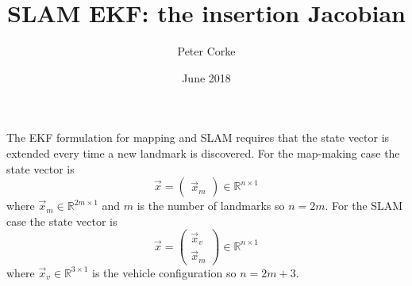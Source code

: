 \documentclass[a4paper]{article}
\title{SLAM EKF: the insertion Jacobian}
\author{Peter Corke}
\date{June 2018}
\newcommand{\matdim}[1]{\text{\scriptsize{\color{red}#1}}}
\newenvironment{ppmatrix}[4]{\def\ppmA{#3}\def\ppmB{#4}\begin{array}{r} \matdim{#1} \\ \matdim{#2} \\ \, \end{array} \hspace*{-2ex} \begin{array}{c} \left( \hspace{-1ex} \begin{array}{cc}}
{\end{array} \hspace{-1ex} \right) \\  \begin{array}{cc} \matdim{\ppmA} & \matdim{\ppmB} \end{array} \end{array}}
\begin{document}
\maketitle

%
%


The EKF formulation for mapping and SLAM requires that the state vector is extended every time a new landmark is discovered.
For the  map-making case the state vector is 
\[
\vec{x} = \begin{pmatrix} \vec{x}_m \end{pmatrix} \in \mathbb{R}^{n \times 1}
\]
where $\vec{x}_m \in \mathbb{R}^{2m \times 1}$ and $m$ is the number of landmarks so $n = 2m$.
For the SLAM case the state vector is
\[
\vec{x} = \begin{pmatrix} \vec{x}_v \\ \vec{x}_m \end{pmatrix}  \in \mathbb{R}^{n \times 1}
\]
where $\vec{x}_v \in \mathbb{R}^{3\times 1}$ is the vehicle configuration so $n = 2m+3$.


\end{document}

